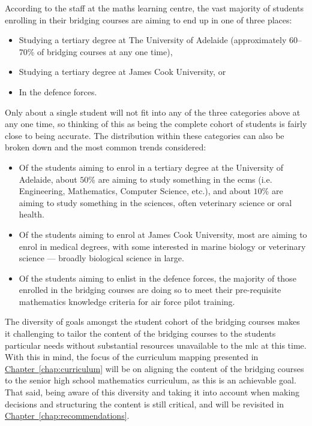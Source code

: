 \documentclass[twoside,12pt,a4paper]{report}
\newcommand{\refchap}[1]{\hyperref[chap:#1]{Chapter~\ref{chap:#1}}}
\begin{document}
According to the staff at the maths learning centre, the vast majority of students enrolling in their bridging courses are aiming to end up in one of three places:
\begin{itemize}
	\item Studying a tertiary degree at The University of Adelaide (approximately $60$--$70$\% of bridging courses at any one time),
	\item Studying a tertiary degree at James Cook University, or
	\item In the defence forces.
\end{itemize}
Only about a single student will not fit into any of the three categories above at any one time, so thinking of this as being the complete cohort of students is fairly close to being accurate. The distribution within these categories can also be broken down and the most common trends considered:
\begin{itemize}
	\item Of the students aiming to enrol in a tertiary degree at the University of Adelaide, about $50$\% are aiming to study something in the \gls{ecms} (i.e. Engineering, Mathematics, Computer Science, etc.), and about $10$\% are aiming to study something in the sciences, often veterinary science or oral health.
	\item Of the students aiming to enrol at James Cook University, most are aiming to enrol in medical degrees, with some interested in marine biology or veterinary science --- broadly biological science in large.
	\item Of the students aiming to enlist in the defence forces, the majority of those enrolled in the bridging courses are doing so to meet their pre-requisite mathematics knowledge criteria for air force pilot training.
\end{itemize}

The diversity of goals amongst the student cohort of the bridging courses makes it challenging to tailor the content of the bridging courses to the students particular needs without substantial resources unavailable to the \gls{mlc} at this time. With this in mind, the focus of the curriculum mapping presented in \refchap{curriculum} will be on aligning the content of the bridging courses to the senior high school mathematics curriculum, as this is an achievable goal. That said, being aware of this diversity and taking it into account when making decisions and structuring the content is still critical, and will be revisited in \refchap{recommendations}.
\end{document}
